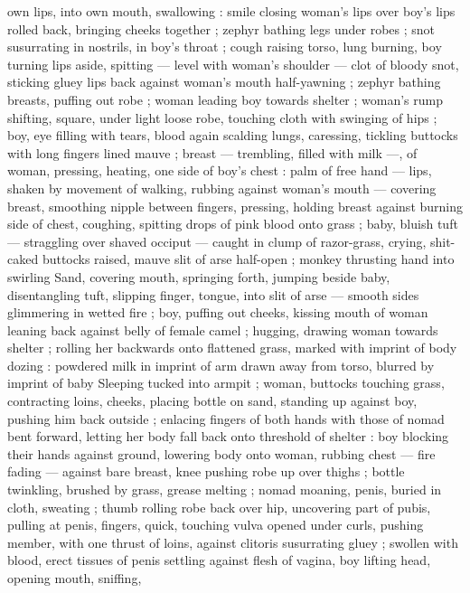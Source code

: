 own lips, into own mouth, swallowing : smile closing woman's lips 
over boy's lips rolled back, bringing cheeks together ; zephyr bathing 
legs under robes ; snot susurrating in nostrils, in boy's throat ; cough 
raising torso, lung burning, boy turning lips aside, spitting --- level 
with woman's shoulder --- clot of bloody snot, sticking gluey lips 
back against woman's mouth half-yawning ; zephyr bathing breasts, 
puffing out robe ; woman leading boy towards shelter ; woman's 
rump shifting, square, under light loose robe, touching cloth with 
swinging of hips ; boy, eye filling with tears, blood again scalding 
lungs, caressing, tickling buttocks with long fingers lined mauve ; 
breast --- trembling, filled with milk ---, of woman, pressing, heating, 
one side of boy's chest : palm of free hand --- lips, shaken by 
movement of walking, rubbing against woman's mouth --- covering 
breast, smoothing nipple between fingers, pressing, holding breast 
against burning side of chest, coughing, spitting drops of pink blood 
onto grass ; baby, bluish tuft --- straggling over shaved occiput --- 
caught in clump of razor-grass, crying, shit-caked buttocks raised, 
mauve slit of arse half-open ; monkey thrusting hand into swirling 
Sand, covering mouth, springing forth, jumping beside baby, 
disentangling tuft, slipping finger, tongue, into slit of arse --- smooth 
sides glimmering in wetted fire ; boy, puffing out cheeks, kissing 
mouth of woman leaning back against belly of female camel ; 
hugging, drawing woman towards shelter ; rolling her backwards onto 
flattened grass, marked with imprint of body dozing : powdered milk 
in imprint of arm drawn away from torso, blurred by imprint of baby 
Sleeping tucked into armpit ; woman, buttocks touching grass, 
contracting loins, cheeks, placing bottle on sand, standing up against 
boy, pushing him back outside ; enlacing fingers of both hands with 
those of nomad bent forward, letting her body fall back onto 
threshold of shelter : boy blocking their hands against ground, 
lowering body onto woman, rubbing chest --- fire fading --- against 
bare breast, knee pushing robe up over thighs ; bottle twinkling, 
brushed by grass, grease melting ; nomad moaning, penis, buried in 
cloth, sweating ; thumb rolling robe back over hip, uncovering part of 
pubis, pulling at penis, fingers, quick, touching vulva opened under 
curls, pushing member, with one thrust of loins, against clitoris 
susurrating gluey ; swollen with blood, erect tissues of penis settling 
against flesh of vagina, boy lifting head, opening mouth, sniffing, 
